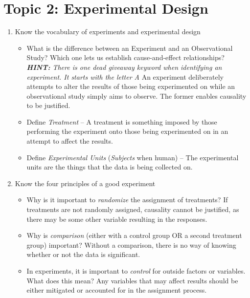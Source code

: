 \documentclass[12pt, A4]{report}
\begin{document}
		\chapter*{Topic 2: Experimental Design}
			\begin{enumerate}
				\item
					Know the vocabulary of experiments and experimental design
						\begin{itemize}
							\item
								What is the difference between an Experiment and an Observational Study? Which one lets us establish cause-and-effect relationships? \emph{\textbf{HINT:} There is one \emph{dead giveaway} keyword when identifying an experiment. It starts with the letter A}
									\subitem
										An experiment deliberately attempts to alter the results of those being experimented on while an observational study simply aims to observe. The former enables causality to be justified.
							\item
								Define \emph{Treatment} --
									\subitem
										A treatment is something imposed by those performing the experiment onto those being experimented on in an attempt to affect the results. 
							\item
								Define \emph{Experimental Units} (\emph{Subjects} when human) --
									\subitem
										The experimental units are the things that the data is being collected on.
						\end{itemize}
				\item
					Know the four principles of a good experiment
						\begin{itemize}
							\item
								Why is it important to \emph{randomize} the assignment of treatments?
									\subitem
										If treatments are not randomly assigned, causality cannot be justified, as there may be some other variable resulting in the responses.
							\item
								Why is \emph{comparison} (either with a control group OR a second treatment group) important?
									\subitem
										Without a comparison, there is no way of knowing whether or not the data is significant.
							\item
								In experiments, it is important to \emph{control} for outside factors or variables. What does this mean?
									\subitem
										Any variables that may affect results should be either mitigated or accounted for in the assignment process.

\end{itemize}
\end{enumerate}
\end{document}
